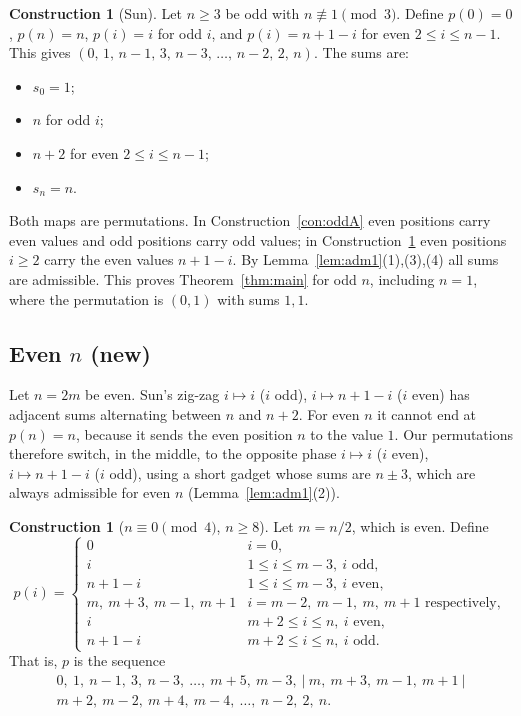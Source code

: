 \documentclass[11pt]{article}
\numberwithin{equation}{section}
\theoremstyle{definition}
\newtheorem{construction}[theorem]{Construction}
\theoremstyle{remark}
\begin{document}
\begin{construction}[Sun]\label{con:oddB}
Let $n\ge3$ be odd with $n\not\equiv1\pmod3$. Define $p(0)=0$, $p(n)=n$, $p(i)=i$ for odd $i$, and
$p(i)=n+1-i$ for even $2\le i\le n-1$. This gives $(0,\,1,\,n-1,\,3,\,n-3,\,\dots,\,n-2,\,2,\,n)$.
The sums are:
\begin{itemize}
  \item $s_0=1$;
  \item $n$ for odd $i$;
  \item $n+2$ for even $2\le i\le n-1$;
  \item $s_n=n$.
\end{itemize}
\end{construction}

Both maps are permutations. In Construction~\ref{con:oddA} even positions carry even values and
odd positions carry odd values; in Construction~\ref{con:oddB} even positions $i\ge2$ carry the even
values $n+1-i$. By Lemma~\ref{lem:adm1}(1),(3),(4) all sums are admissible. This proves Theorem~\ref{thm:main}
for odd $n$, including $n=1$, where the permutation is $(0,1)$ with sums $1,1$.

\subsection{Even \texorpdfstring{$n$}{n} (new)}\label{sec:even}

Let $n=2m$ be even. Sun's zig-zag $i\mapsto i$ ($i$ odd), $i\mapsto n+1-i$ ($i$ even) has adjacent sums
alternating between $n$ and $n+2$. For even $n$ it cannot end at $p(n)=n$, because it sends the even
position $n$ to the value $1$. Our permutations therefore switch, in the middle, to the opposite
phase $i\mapsto i$ ($i$ even), $i\mapsto n+1-i$ ($i$ odd), using a short gadget whose sums are
$n\pm3$, which are always admissible for even $n$ (Lemma~\ref{lem:adm1}(2)).

\begin{construction}[$n\equiv0\pmod4$, $n\ge8$]\label{con:evenA}
Let $m=n/2$, which is even. Define
\[
p(i)=\begin{cases}
0 & i=0,\\
i & 1\le i\le m-3,\ i\text{ odd},\\
n+1-i & 1\le i\le m-3,\ i \text{ even},\\
m,\ m+3,\ m-1,\ m+1 & i=m-2,\ m-1,\ m,\ m+1 \text{ respectively},\\
i & m+2\le i\le n,\ i\text{ even},\\
n+1-i & m+2\le i\le n,\ i\text{ odd}.
\end{cases}
\]
That is, $p$ is the sequence
\[
\begin{gathered}0,\ 1,\ n-1,\ 3,\ n-3,\ \dots,\ m+5,\ m-3,\ \big|\ m,\ m+3,\ m-1,\ m+1\ \big|\\ m+2,\ m-2,\ m+4,\ m-4,\ \dots,\ n-2,\ 2,\ n.\end{gathered}
\]
\end{construction}
\end{document}
